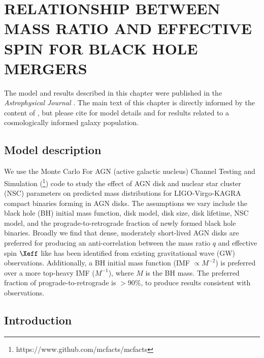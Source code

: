 \section{\texorpdfstring{\MakeUppercase{relationship between mass ratio and effective spin for black hole mergers}}{relationship between mass ratio and effective spin for black hole mergers}}
\label{sec:qXeff}


\par The model and results described in this chapter were published in the \textit{Astrophysical Journal} \citep{McKernan+25-mcfactsI,Cook+25,Delfavero+25}.
The main text of this chapter is directly informed by the content of \citet{Cook+25}, but please cite \citet{McKernan+25-mcfactsI} for model details and \citet{Delfavero+25} for reslults related to a cosmologically informed galaxy population.

\subsection{Model description}

We use the Monte Carlo For AGN (active galactic nucleus) Channel Testing and Simulation (\footnote{https://www.github.com/mcfacts/mcfacts}) code to study the effect of AGN disk and nuclear star cluster (NSC) parameters on predicted mass distributions for LIGO-Virgo-KAGRA compact binaries forming in AGN disks.
The assumptions we vary include the black hole (BH) initial mass function, disk model, disk size, disk lifetime, NSC model, and the prograde-to-retrograde fraction of newly formed black hole binaries.
Broadly we find that dense, moderately short-lived AGN disks are preferred for producing an anti-correlation between the mass ratio $q$ and effective spin $\Xeff$ like has been identified from existing gravitational wave (GW) observations.
Additionally, a BH initial mass function (IMF $\propto M^{-2}$) is preferred over a more top-heavy IMF ($M^{-1}$), where $M$ is the BH mass.
The preferred fraction of prograde-to-retrograde is $>90\%$, to produce results consistent with observations.




\subsection{Introduction}
\label{sec:intro-ch2}

